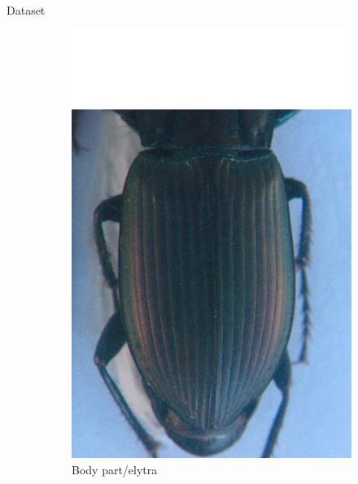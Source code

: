 \documentclass[10pt,svgnames]{beamer}
\begin{document}
\begin{frame}[c]{Dataset}
	\begin{figure}[htbp]
    			\begin{subfigure}[t]{0.3\textwidth}
        			\centering
        			\includegraphics[scale=.2]{images/elytre2}
        			\caption*{\footnotesize{Body part/elytra}}
        			\label{figsub22}
    			\end{subfigure}
    			~ 
    			\begin{subfigure}[t]{0.3\textwidth}
        			\centering

\end{subfigure}
\end{figure}
\end{frame}
\end{document}
